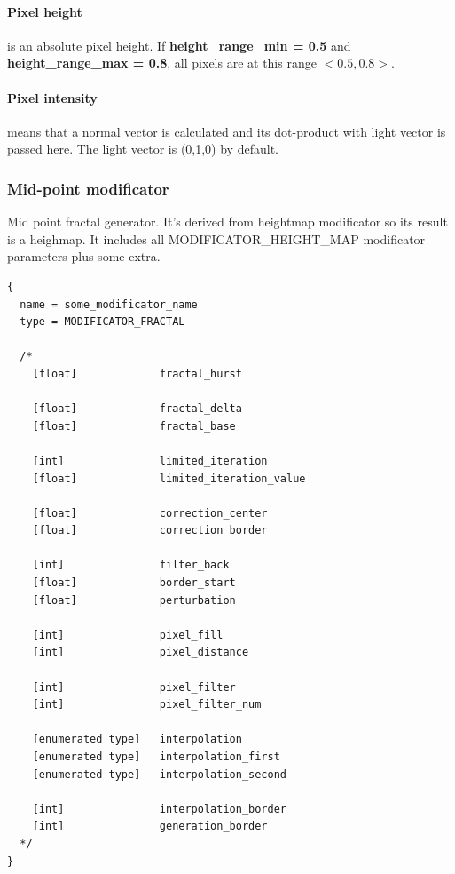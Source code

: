 \documentclass[9pt]{article}
\begin{document}
\paragraph*{Pixel height} is an absolute pixel height. 
If {\bf height\_range\_min = 0.5} and {\bf height\_range\_max = 0.8},
all pixels are at this range \begin{math}<0.5,0.8>\end{math}.

\paragraph*{Pixel intensity} means that a normal vector is 
calculated and its dot-product with light vector 
is passed here. The light vector is (0,1,0) by default.

\subsubsection{Mid-point modificator}

Mid point fractal generator. It's derived from heightmap modificator
so its result is a heighmap. It includes all MODIFICATOR\_HEIGHT\_MAP modificator 
parameters plus some extra.

\begin{verbatim}
{
  name = some_modificator_name
  type = MODIFICATOR_FRACTAL

  /*
    [float]             fractal_hurst
  
    [float]             fractal_delta
    [float]             fractal_base
    
    [int]               limited_iteration
    [float]             limited_iteration_value
    
    [float]             correction_center
    [float]             correction_border
    
    [int]               filter_back
    [float]             border_start
    [float]             perturbation
    
    [int]               pixel_fill
    [int]               pixel_distance
    
    [int]               pixel_filter
    [int]               pixel_filter_num
  
    [enumerated type]   interpolation
    [enumerated type]   interpolation_first
    [enumerated type]   interpolation_second
    
    [int]               interpolation_border      
    [int]               generation_border
  */  
}
\end{verbatim}
\end{document}
